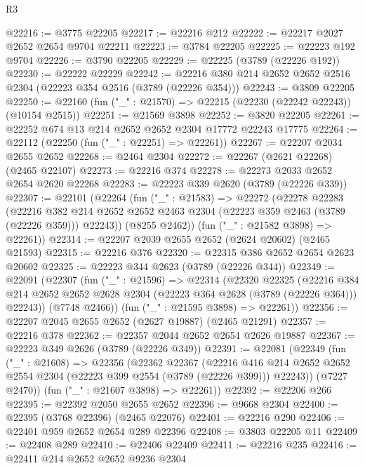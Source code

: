 \begin{lexlean}{R3}
\begin{coremodule}
@22216 := @3775 @22205
@22217 := @22216 @212
@22222 := @22217 @2027 @2652 @2654 @9704 @22211
@22223 := @3784 @22205
@22225 := @22223 @192 @9704
@22226 := @3790 @22205
@22229 := @22225 (@3789 (@22226 @192))
@22230 := @22222 @22229
@22242 := @22216 @380 @214 @2652 @2652 @2516 @2304 (@22223 @354 @2516 (@3789 (@22226 @354)))
@22243 := @3809 @22205
@22250 := @22160 (fun ("_" : @21570) => @22215 (@22230 (@22242 @22243)) (@10154 @2515))
@22251 := @21569 @3898
@22252 := @3820 @22205
@22261 := @22252 @674 @13 @214 @2652 @2652 @2304 @17772 @22243 @17775
@22264 := @22112 (@22250 (fun ("_" : @22251) => @22261))
@22267 := @22207 @2034 @2655 @2652
@22268 := @2464 @2304
@22272 := @22267 (@2621 @22268) (@2465 @22107)
@22273 := @22216 @374
@22278 := @22273 @2033 @2652 @2654 @2620 @22268
@22283 := @22223 @339 @2620 (@3789 (@22226 @339))
@22307 := @22101
    (@22264
      (fun ("_" : @21583) =>
      @22272
        (@22278
          @22283
          (@22216
            @382
            @214
            @2652
            @2652
            @2463
            @2304
            (@22223 @359 @2463 (@3789 (@22226 @359)))
            @22243))
        (@8255 @2462))
      (fun ("_" : @21582 @3898) => @22261))
@22314 := @22207 @2039 @2655 @2652 (@2624 @20602) (@2465 @21593)
@22315 := @22216 @376
@22320 := @22315 @386 @2652 @2654 @2623 @20602
@22325 := @22223 @344 @2623 (@3789 (@22226 @344))
@22349 := @22091
    (@22307
      (fun ("_" : @21596) =>
      @22314
        (@22320
          @22325
          (@22216
            @384
            @214
            @2652
            @2652
            @2628
            @2304
            (@22223 @364 @2628 (@3789 (@22226 @364)))
            @22243))
        (@7748 @2466))
      (fun ("_" : @21595 @3898) => @22261))
@22356 := @22207 @2045 @2655 @2652 (@2627 @19887) (@2465 @21291)
@22357 := @22216 @378
@22362 := @22357 @2044 @2652 @2654 @2626 @19887
@22367 := @22223 @349 @2626 (@3789 (@22226 @349))
@22391 := @22081
    (@22349
      (fun ("_" : @21608) =>
      @22356
        (@22362
          @22367
          (@22216
            @416
            @214
            @2652
            @2652
            @2554
            @2304
            (@22223 @399 @2554 (@3789 (@22226 @399)))
            @22243))
        (@7227 @2470))
      (fun ("_" : @21607 @3898) => @22261))
@22392 := @22206 @266
@22395 := @22392 @2050 @2655 @2652
@22396 := @9668 @2304
@22400 := @22395 (@3768 @22396) (@2465 @22076)
@22401 := @22216 @290
@22406 := @22401 @959 @2652 @2654 @289 @22396
@22408 := @3803 @22205 @11
@22409 := @22408 @289
@22410 := @22406 @22409
@22411 := @22216 @235
@22416 := @22411 @214 @2652 @2652 @9236 @2304

\end{coremodule}
\end{lexlean}
